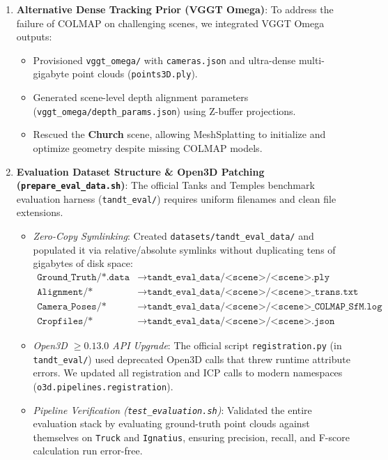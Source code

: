\begin{enumerate}[leftmargin=*]
    \item \textbf{Alternative Dense Tracking Prior (VGGT Omega)}:
    To address the failure of COLMAP on challenging scenes, we integrated VGGT Omega outputs:
    \begin{itemize}
        \item Provisioned \texttt{vggt\_omega/} with \texttt{cameras.json} and ultra-dense multi-gigabyte point clouds (\texttt{points3D.ply}).
        \item Generated scene-level depth alignment parameters (\texttt{vggt\_omega/depth\_params.json}) using Z-buffer projections.
        \item Rescued the \textbf{Church} scene, allowing MeshSplatting to initialize and optimize geometry despite missing COLMAP models.
    \end{itemize}

    \item \textbf{Evaluation Dataset Structure \& Open3D Patching (\texttt{prepare\_eval\_data.sh})}:
    The official Tanks and Temples benchmark evaluation harness (\texttt{tandt\_eval/}) requires uniform filenames and clean file extensions.
    \begin{itemize}
        \item \textit{Zero-Copy Symlinking}: Created \texttt{datasets/tandt\_eval\_data/} and populated it via relative/absolute symlinks without duplicating tens of gigabytes of disk space:
        \begin{align*}
            \texttt{Ground\_Truth/*.data} &\longrightarrow \texttt{tandt\_eval\_data/<scene>/<scene>.ply} \\
            \texttt{Alignment/*} &\longrightarrow \texttt{tandt\_eval\_data/<scene>/<scene>\_trans.txt} \\
            \texttt{Camera\_Poses/*} &\longrightarrow \texttt{tandt\_eval\_data/<scene>/<scene>\_COLMAP\_SfM.log} \\
            \texttt{Cropfiles/*} &\longrightarrow \texttt{tandt\_eval\_data/<scene>/<scene>.json}
        \end{align*}
        \item \textit{Open3D $\ge 0.13.0$ API Upgrade}: The official script \texttt{registration.py} (in \texttt{tandt\_eval/}) used deprecated Open3D calls that threw runtime attribute errors. We updated all registration and ICP calls to modern namespaces (\texttt{o3d.pipelines.registration}).
        \item \textit{Pipeline Verification (\texttt{test\_evaluation.sh})}: Validated the entire evaluation stack by evaluating ground-truth point clouds against themselves on \texttt{Truck} and \texttt{Ignatius}, ensuring precision, recall, and F-score calculation run error-free.
    \end{itemize}
\end{enumerate}

